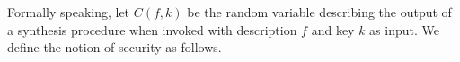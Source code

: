 


Formally speaking, let $C(f,k)$ be the random variable describing the output of a synthesis procedure when invoked with description $f$ and key $k$ as input. We define the notion of security as follows.

